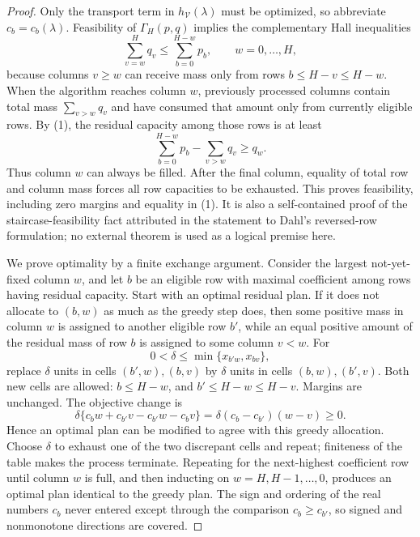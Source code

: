 \documentclass{article}
\begin{document}
\begin{proof}
Only the transport term in \(h_{\mathcal V}(\lambda)\) must be optimized, so abbreviate \(c_b=c_b(\lambda)\).  Feasibility of \(\Gamma_H(p,q)\) implies the complementary Hall inequalities
\[
 \sum_{v=w}^{H}q_v\le\sum_{b=0}^{H-w}p_b,
 \qquad w=0,\ldots,H,                                    \tag{1}
\]
because columns \(v\ge w\) can receive mass only from rows \(b\le H-v\le H-w\).  When the algorithm reaches column \(w\), previously processed columns contain total mass \(\sum_{v>w}q_v\) and have consumed that amount only from currently eligible rows.  By (1), the residual capacity among those rows is at least
\[
 \sum_{b=0}^{H-w}p_b-\sum_{v>w}q_v\ge q_w.                \tag{2}
\]
Thus column \(w\) can always be filled.  After the final column, equality of total row and column mass forces all row capacities to be exhausted.  This proves feasibility, including zero margins and equality in (1).  It is also a self-contained proof of the staircase-feasibility fact attributed in the statement to Dahl's reversed-row formulation; no external theorem is used as a logical premise here.

We prove optimality by a finite exchange argument.  Consider the largest not-yet-fixed column \(w\), and let \(b\) be an eligible row with maximal coefficient among rows having residual capacity.  Start with an optimal residual plan.  If it does not allocate to \((b,w)\) as much as the greedy step does, then some positive mass in column \(w\) is assigned to another eligible row \(b'\), while an equal positive amount of the residual mass of row \(b\) is assigned to some column \(v<w\).  For
\[
 0<\delta\le\min\{x_{b'w},x_{bv}\},
\]
replace \(\delta\) units in cells \((b',w),(b,v)\) by \(\delta\) units in cells \((b,w),(b',v)\).  Both new cells are allowed: \(b\le H-w\), and \(b'\le H-w\le H-v\).  Margins are unchanged.  The objective change is
\[
 \delta\{c_bw+c_{b'}v-c_{b'}w-c_bv\}
 =\delta(c_b-c_{b'})(w-v)\ge0.                            \tag{3}
\]
Hence an optimal plan can be modified to agree with this greedy allocation.  Choose \(\delta\) to exhaust one of the two discrepant cells and repeat; finiteness of the table makes the process terminate.  Repeating for the next-highest coefficient row until column \(w\) is full, and then inducting on \(w=H,H-1,\ldots,0\), produces an optimal plan identical to the greedy plan.  The sign and ordering of the real numbers \(c_b\) never entered except through the comparison \(c_b\ge c_{b'}\), so signed and nonmonotone directions are covered.


\end{proof}
\end{document}

